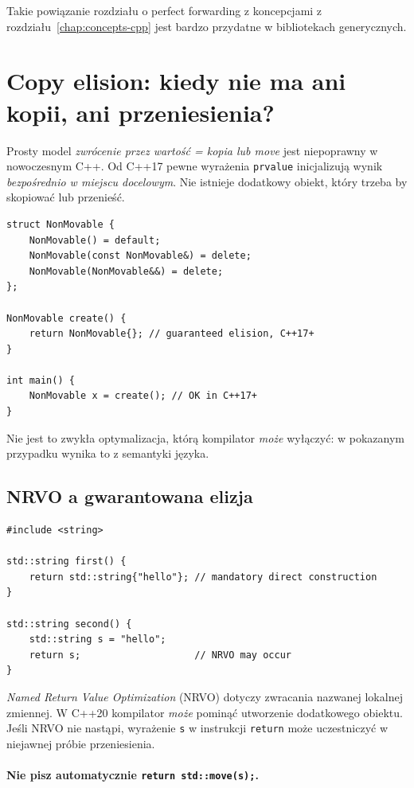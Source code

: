 Takie powiązanie rozdziału o perfect forwarding z koncepcjami
z rozdziału~\ref{chap:concepts-cpp} jest bardzo przydatne
w bibliotekach generycznych.

\section{Copy elision: kiedy nie ma ani kopii, ani przeniesienia?}
\label{sec:move-elision}

Prosty model \emph{zwrócenie przez wartość = kopia lub move}
jest niepoprawny w nowoczesnym C++. Od C++17 pewne wyrażenia
\texttt{prvalue} inicjalizują wynik \emph{bezpośrednio w miejscu
docelowym}. Nie istnieje dodatkowy obiekt, który trzeba by
skopiować lub przenieść.

\begin{lstlisting}
struct NonMovable {
    NonMovable() = default;
    NonMovable(const NonMovable&) = delete;
    NonMovable(NonMovable&&) = delete;
};

NonMovable create() {
    return NonMovable{}; // guaranteed elision, C++17+
}

int main() {
    NonMovable x = create(); // OK in C++17+
}
\end{lstlisting}

Nie jest to zwykła optymalizacja, którą kompilator \emph{może}
wyłączyć: w pokazanym przypadku wynika to z semantyki języka.

\subsection{NRVO a gwarantowana elizja}

\begin{lstlisting}
#include <string>

std::string first() {
    return std::string{"hello"}; // mandatory direct construction
}

std::string second() {
    std::string s = "hello";
    return s;                    // NRVO may occur
}
\end{lstlisting}

\textit{Named Return Value Optimization} (NRVO) dotyczy
zwracania nazwanej lokalnej zmiennej. W C++20 kompilator \emph{może}
pominąć utworzenie dodatkowego obiektu. Jeśli NRVO nie nastąpi,
wyrażenie \texttt{s} w instrukcji \texttt{return} może
uczestniczyć w niejawnej próbie przeniesienia.

\paragraph{Nie pisz automatycznie \texttt{return std::move(s);}.}

